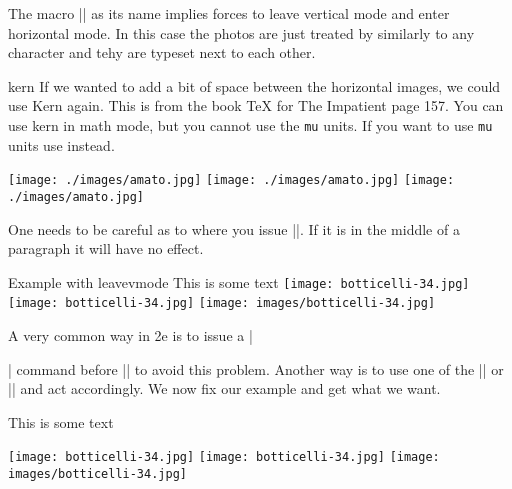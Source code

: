 The macro |\leavevmode| as its name implies forces \tex to leave vertical mode and enter horizontal mode. In this case the photos are just treated by \tex similarly to any character and tehy are typeset next to each other. 

\begin{docCommand}{kern}{}
If we wanted to add a bit of space between the horizontal images, we could use 
Kern again. This is from the book TeX for The Impatient page 157. You can use kern in math mode, but you cannot use the \texttt{mu} units. If you want to use \texttt{mu} units use  instead.
\end{docCommand}

\begin{texexample}{}{}
\leavevmode
\hbox{\texttt{[image: ./images/amato.jpg]}}\kern10pt
\hbox{\texttt{[image: ./images/amato.jpg]}}\kern10pt
\hbox{\texttt{[image: ./images/amato.jpg]}}%
\end{texexample}

One needs to be careful as to where you issue |\leavevmode|. If it is in the middle of a paragraph it will have no effect.
\begin{texexample}{Example with leavevmode}{}
This is some text
\leavevmode
\hbox{\texttt{[image: botticelli-34.jpg]}}\kern10pt
\hbox{\texttt{[image: botticelli-34.jpg]}}\kern10pt
\hbox{\texttt{[image: images/botticelli-34.jpg]}}%
\end{texexample}

A very common way in \latex2e is to issue a |\par| command before |\leavevmode| to avoid this problem. Another way is to use
one of the |\ifvmode| or |\ifhmode| and act accordingly. We now fix our example and get what we want. 

\begin{texexample}{}{}
This is some text
\par\leavevmode
\hbox{\texttt{[image: botticelli-34.jpg]}}\kern10pt
\hbox{\texttt{[image: botticelli-34.jpg]}}\kern10pt
\hbox{\texttt{[image: images/botticelli-34.jpg]}}%
\end{texexample}

\begin{texexample}{}{}
   \HHUGE
   \fboxsep=0pt
\end{texexample}

